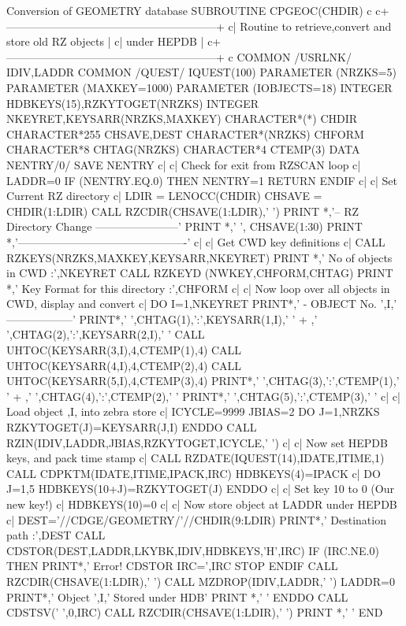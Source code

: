 \begin{XMPt}{Conversion of GEOMETRY database}
      SUBROUTINE CPGEOC(CHDIR)
c
c+---------------------------------------------------------+
c|    Routine to retrieve,convert and store old RZ objects |
c|    under HEPDB                                          |
c+---------------------------------------------------------+
c
      COMMON /USRLNK/   IDIV,LADDR
      COMMON /QUEST/    IQUEST(100)
      PARAMETER         (NRZKS=5)
      PARAMETER         (MAXKEY=1000)
      PARAMETER         (IOBJECTS=18)
      INTEGER            HDBKEYS(15),RZKYTOGET(NRZKS)
      INTEGER            NKEYRET,KEYSARR(NRZKS,MAXKEY)
      CHARACTER*(*)      CHDIR
      CHARACTER*255      CHSAVE,DEST
      CHARACTER*(NRZKS)  CHFORM
      CHARACTER*8        CHTAG(NRZKS)
      CHARACTER*4        CTEMP(3)
      DATA               NENTRY/0/
      SAVE               NENTRY
c|
c|    Check for exit from RZSCAN loop
c|
      LADDR=0
      IF (NENTRY.EQ.0) THEN
         NENTRY=1
         RETURN
      ENDIF
c|
c|    Set Current RZ directory
c|
      LDIR    = LENOCC(CHDIR)
      CHSAVE  = CHDIR(1:LDIR)
      CALL RZCDIR(CHSAVE(1:LDIR),' ')
      PRINT *,'-- RZ Directory Change -----------------------'
      PRINT *,' ', CHSAVE(1:30)
      PRINT *,'----------------------------------------------'
c|
c|    Get CWD key definitions
c|
      CALL RZKEYS(NRZKS,MAXKEY,KEYSARR,NKEYRET)
      PRINT *,' No of objects in CWD          :',NKEYRET
      CALL RZKEYD (NWKEY,CHFORM,CHTAG)
      PRINT *,' Key Format for this directory :',CHFORM
c|
c|    Now loop over all objects in CWD, display and convert
c|
      DO I=1,NKEYRET
           PRINT*,' - OBJECT No. ',I,' ------------------'
           PRINT*,' ',CHTAG(1),':',KEYSARR(1,I),'  '
     +           ,' ',CHTAG(2),':',KEYSARR(2,I),'  '
           CALL UHTOC(KEYSARR(3,I),4,CTEMP(1),4)
           CALL UHTOC(KEYSARR(4,I),4,CTEMP(2),4)
           CALL UHTOC(KEYSARR(5,I),4,CTEMP(3),4)
           PRINT*,' ',CHTAG(3),':',CTEMP(1),'  '
     +           ,' ',CHTAG(4),':',CTEMP(2),'  '
           PRINT*,' ',CHTAG(5),':',CTEMP(3),'  '
c|
c|         Load object ,I, into zebra store
c|
           ICYCLE=9999
           JBIAS=2
           DO J=1,NRZKS
                RZKYTOGET(J)=KEYSARR(J,I)
           ENDDO
           CALL RZIN(IDIV,LADDR,JBIAS,RZKYTOGET,ICYCLE,' ')
c|
c|         Now set HEPDB keys, and pack time stamp
c|
           CALL RZDATE(IQUEST(14),IDATE,ITIME,1)
           CALL CDPKTM(IDATE,ITIME,IPACK,IRC)
           HDBKEYS(4)=IPACK
c|
           DO J=1,5
                HDBKEYS(10+J)=RZKYTOGET(J)
           ENDDO
c|
c|         Set key 10 to 0 (Our new key!)
c|
           HDBKEYS(10)=0
c|
c|         Now store object at LADDR under HEPDB
c|
           DEST='//CDGE/GEOMETRY/'//CHDIR(9:LDIR)
           PRINT*,' Destination path        :',DEST
           CALL CDSTOR(DEST,LADDR,LKYBK,IDIV,HDBKEYS,'H',IRC)
           IF (IRC.NE.0) THEN
               PRINT*,' Error! CDSTOR IRC=',IRC
               STOP
           ENDIF
           CALL RZCDIR(CHSAVE(1:LDIR),' ')
           CALL MZDROP(IDIV,LADDR,' ')
           LADDR=0
           PRINT*,' Object ',I,' Stored under HDB'
           PRINT *,' '
      ENDDO
      CALL CDSTSV(' ',0,IRC)
      CALL RZCDIR(CHSAVE(1:LDIR),' ')
      PRINT *,' '
      END

\end{XMPt}
